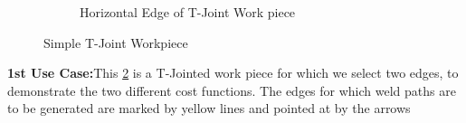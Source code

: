 \begin{figure}[!htbp]
\begin{subfigure}[b]{0.4\textwidth}
		\caption{Horizontal Edge of T-Joint Work  piece} 
	\label{fig:imguc2}
	\end{subfigure}		
	\caption{Simple T-Joint Workpiece}  
	\label{fig:uc1}
\end{figure}
\textbf{1st Use Case:}This \ref{fig:uc1} is a T-Jointed work piece for which we select two edges, to demonstrate the two different cost functions. The edges for which weld paths are to be generated are marked by yellow lines and pointed at by the arrows

